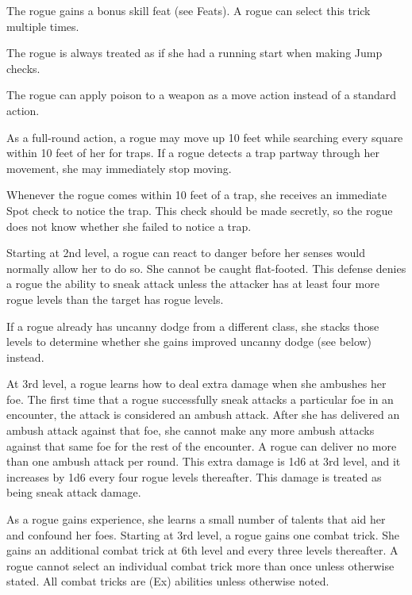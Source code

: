  The rogue gains a bonus skill feat (see Feats). A rogue can select this trick multiple times.

 The rogue is always treated as if she had a running start when making Jump checks.

 The rogue can apply poison to a weapon as a move action instead of a standard action.

 As a full-round action, a rogue may move up 10 feet while searching every square within 10 feet of her for traps. If a rogue detects a trap partway through her movement, she may immediately stop moving.

 Whenever the rogue comes within 10 feet of a trap, she receives an immediate Spot check to notice the trap. This check should be made secretly, so the rogue does not know whether she failed to notice a trap.

 Starting at 2nd level, a rogue can react to danger before her senses would normally allow her to do so. She cannot be caught flat-footed. This defense denies a rogue the ability to sneak attack unless the attacker has at least four more rogue levels than the target has rogue levels.

If a rogue already has uncanny dodge from a different class, she stacks those levels to determine whether she gains improved uncanny dodge (see below) instead.

 At 3rd level, a rogue learns how to deal extra damage when she ambushes her foe. The first time that a rogue successfully sneak attacks a particular foe in an encounter, the attack is considered an ambush attack. After she has delivered an ambush attack against that foe, she cannot make any more ambush attacks against that same foe for the rest of the encounter. A rogue can deliver no more than one ambush attack per round. This extra damage is 1d6 at 3rd level, and it increases by 1d6 every four rogue levels thereafter. This damage is treated as being sneak attack damage.

 As a rogue gains experience, she learns a small number of talents that aid her and confound her foes. Starting at 3rd level, a rogue gains one combat trick. She gains an additional combat trick at 6th level and every three levels thereafter. A rogue cannot select an individual combat trick more than once unless otherwise stated. All combat tricks are (Ex) abilities unless otherwise noted.

